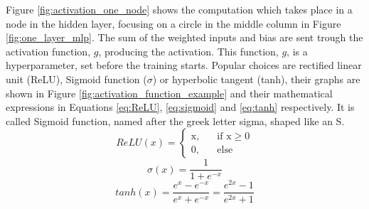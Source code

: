 Figure \ref{fig:activation_one_node} shows the computation which takes place in a node in the hidden layer, focusing on a circle in the middle column in Figure \ref{fig:one_layer_mlp}. The sum of the weighted inputs and bias are sent trough the activation function, $g$, producing the activation. This function, $g$, is a hyperparameter, set before the training starts. Popular choices are rectified linear unit (ReLU), Sigmoid function  ($\sigma$) or hyperbolic tangent (tanh), their graphs are shown in Figure \ref{fig:activation_function_example} and their mathematical expressions in Equations \eqref{eq:ReLU}, \eqref{eq:sigmoid} and \eqref{eq:tanh} respectively. It is called Sigmoid function, named after the greek letter sigma, shaped like an S. 
\begin{equation} \label{eq:ReLU}
   ReLU\left(x\right) = 
     \begin{cases}
       \text{x,} &\quad\text{if x} \ge 0\\
       \text{0,} &\quad\text{else}
     \end{cases}
\end{equation}
\begin{equation} \label{eq:sigmoid}
   \sigma \left( x \right) = \frac{1}{1 + e^{-x}}
\end{equation}
\begin{equation} \label{eq:tanh}
   tanh\left( x \right) = \frac{e^x - e^{-x}}{e^x + e^{-x}} = \frac{e^{2x} - 1}{e^{2x} + 1}
\end{equation}

